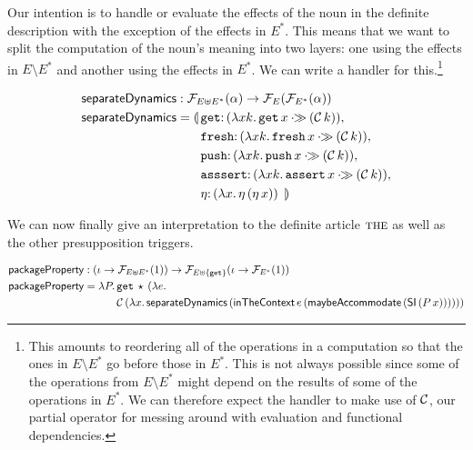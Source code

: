 Our intention is to handle or evaluate the effects of the noun in the
definite description with the exception of the effects in $E^*$. This means
that we want to split the computation of the noun's meaning into two
layers: one using the effects in $E \setminus E^*$ and another using the
effects in $E^*$. We can write a handler for this.\footnote{This amounts to
  reordering all of the operations in a computation so that the ones in
  $E \setminus E^*$ go before those in $E^*$. This is not always possible
  since some of the operations from $E \setminus E^*$ might depend on the
  results of some of the operations in $E^*$. We can therefore expect the
  handler to make use of $\mathcal{C}$, our partial operator for messing around
  with evaluation and functional dependencies.}

\begin{align*}
  \separateDynamics &: \FF_{E \uplus E^*}(\alpha) \to \FF_E(\FF_{E^*}(\alpha)) \\
  \separateDynamics &= \lban \begin{aligned}[t]
      &\onto{\op{get}}{(\lam{x k}{\ap{\op{get}}{x} \apr (\ap{\CC}{k})})}, \\
      &\onto{\op{fresh}}{(\lam{x k}{\ap{\op{fresh}}{x} \apr (\ap{\CC}{k})})}, \\
      &\onto{\op{push}}{(\lam{x k}{\ap{\op{push}}{x} \apr (\ap{\CC}{k})})}, \\
      &\onto{\op{asssert}}{(\lam{x k}{\ap{\op{assert}}{x} \apr (\ap{\CC}{k})})}, \\
      &\onto{\eta}{(\lam{x}{\etaE{(\etaE{x})}})}\ \rban
    \end{aligned}
\end{align*}

We can now finally give an interpretation to the definite article
$\textsc{the}$ as well as the other presupposition triggers.

\begin{align*}
  \mathsf{packageProperty} &: (\iota \to \mathcal{F}_{E \uplus E^*}(1))
                  \to \mathcal{F}_{E \uplus \{\mathtt{get}\}}(\iota \to \mathcal{F}_{E^*}(1)) \\
  \mathsf{packageProperty} &= \lambda P.\, \begin{aligned}[t]
      &\mathtt{get}\,\star\,(\lambda e.\,  \\
      &\mathcal{C}\,(\lambda x.\, \mathsf{separateDynamics}\,(\mathsf{inTheContext}\,e\,(\mathsf{maybeAccommodate}\,(\mathsf{SI}\,(P\,x))))))
    \end{aligned}
\end{align*}

